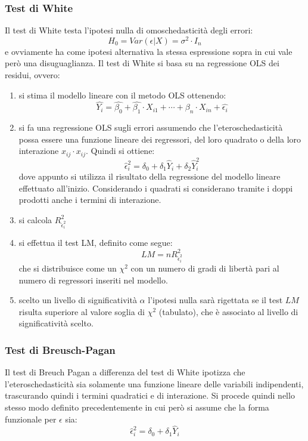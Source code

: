 \documentclass[]{article}
\begin{document}
\subsubsection{Test di White}
Il test di White testa l'ipotesi nulla di omoschedasticità degli errori:
\begin{equation}
	H_0 = Var(\epsilon \vert X) = \sigma^2 \cdot I_n
\end{equation}
e ovviamente ha come ipotesi alternativa la stessa espressione sopra in cui vale però una disuguaglianza.
Il test di White si basa su na regressione OLS dei residui, ovvero:
\begin{enumerate}
	\item si stima il modello lineare con il metodo OLS ottenendo:
	\begin{equation}
		\hat{Y_i} = \hat{\beta_0} + \hat{\beta_1} \cdot X_{i1} + \cdots + \beta_n \cdot X_{in} + \hat{\epsilon_i}
	\end{equation}
	\item si fa una regressione OLS  sugli errori assumendo che l'eteroschedasticità possa essere una funzione lineare dei regressori, del loro quadrato o della loro interazione $x_{ij}\cdot x_{ij}$. Quindi si ottiene:
	\begin{equation}
		\hat{\epsilon}_i^2 = \delta_0 + \delta_1 \hat{Y}_i + \delta_2 \hat{Y}_i^2
	\end{equation}
	dove appunto si utilizza il risultato della regressione del modello lineare effettuato all'inizio. Considerando i quadrati si considerano tramite i doppi prodotti anche i termini di interazione.
	\item si calcola $R^2_{\hat{\epsilon}_i^2}$
	\item si effettua il test LM, definito come segue:
	\begin{equation}
		LM = nR^2_{\hat{\epsilon}_i^2}
	\end{equation}
	che si distribuisce come un $\chi^2$ con un numero di gradi di libertà pari al numero di regressori inseriti nel modello.
	\item scelto un livello di significatività $\alpha$ l'ipotesi nulla sarà rigettata se il test $LM$ risulta superiore al valore soglia di $\chi^2$ (tabulato), che è associato al livello di significatività scelto.
\end{enumerate}
\subsubsection{Test di Breusch-Pagan}
Il test di Breuch Pagan a differenza del test di White ipotizza che l'eteroschedasticità sia solamente una funzione lineare delle variabili indipendenti, trascurando quindi i termini quadratici e di interazione. Si procede quindi nello stesso modo definito precedentemente in cui però si assume che la forma funzionale per $\epsilon$ sia:
\begin{equation}
	\hat{\epsilon}_i^2 = \delta_0 + \delta_1\hat{Y}_i
\end{equation}
\end{document}
